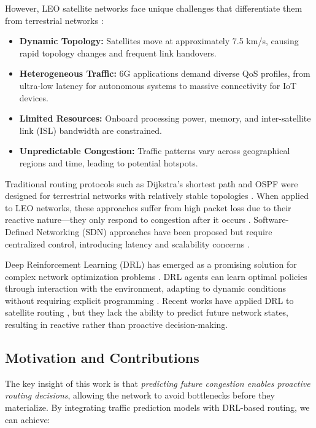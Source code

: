\documentclass[journal]{IEEEtran}
\begin{document}
However, LEO satellite networks face unique challenges that differentiate them from terrestrial networks \cite{liu2021routing}:

\begin{itemize}
\item \textbf{Dynamic Topology:} Satellites move at approximately 7.5 km/s, causing rapid topology changes and frequent link handovers.
\item \textbf{Heterogeneous Traffic:} 6G applications demand diverse QoS profiles, from ultra-low latency for autonomous systems to massive connectivity for IoT devices.
\item \textbf{Limited Resources:} Onboard processing power, memory, and inter-satellite link (ISL) bandwidth are constrained.
\item \textbf{Unpredictable Congestion:} Traffic patterns vary across geographical regions and time, leading to potential hotspots.
\end{itemize}

Traditional routing protocols such as Dijkstra's shortest path and OSPF were designed for terrestrial networks with relatively stable topologies \cite{katz2003optimized}. When applied to LEO networks, these approaches suffer from high packet loss due to their reactive nature—they only respond to congestion after it occurs \cite{ekici2009comparative}. Software-Defined Networking (SDN) approaches have been proposed but require centralized control, introducing latency and scalability concerns \cite{papa2021design}.

Deep Reinforcement Learning (DRL) has emerged as a promising solution for complex network optimization problems \cite{luong2019applications}. DRL agents can learn optimal policies through interaction with the environment, adapting to dynamic conditions without requiring explicit programming \cite{mao2016resource}. Recent works have applied DRL to satellite routing \cite{wang2021intelligent, chen2021deep}, but they lack the ability to predict future network states, resulting in reactive rather than proactive decision-making.

\subsection{Motivation and Contributions}

The key insight of this work is that \textit{predicting future congestion enables proactive routing decisions}, allowing the network to avoid bottlenecks before they materialize. By integrating traffic prediction models with DRL-based routing, we can achieve:
\end{document}
